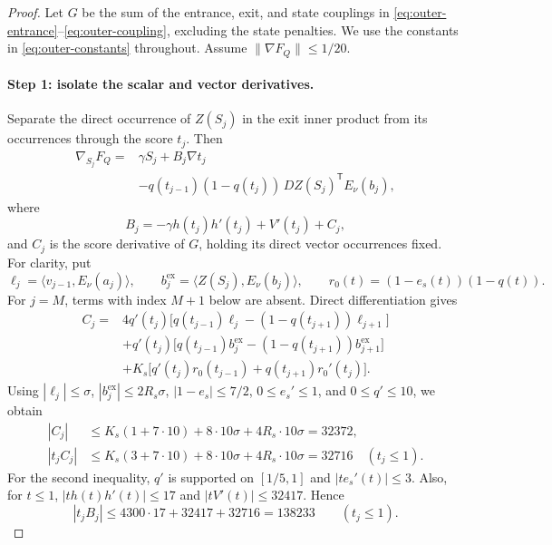 \documentclass[11pt,letterpaper]{article}
\theoremstyle{definition}
\theoremstyle{remark}
\begin{document}
\begin{proof}
Let $G$ be the sum of the entrance, exit, and state couplings in
\eqref{eq:outer-entrance}--\eqref{eq:outer-coupling}, excluding the state
penalties. We use the constants in \eqref{eq:outer-constants} throughout.
Assume $\|\nabla F_Q\|\le1/20$.

\paragraph{Step 1: isolate the scalar and vector derivatives.}
Separate the direct occurrence of $Z(S_j)$ in the exit inner product from
its occurrences through the score $t_j$. Then
\begin{equation}
\begin{split}
 \nabla_{S_j}F_Q
 ={}&\gamma S_j+B_j\nabla t_j\\
 &-q(t_{j-1})(1-q(t_j))\,DZ(S_j)^{\mathsf T}E_\nu(b_j),
\end{split}
\label{eq:state-gradient}
\end{equation}
where
\[
 B_j=-\gamma h(t_j)h'(t_j)+V'(t_j)+C_j,
\]
and $C_j$ is the score derivative of $G$, holding its direct vector
occurrences fixed. For clarity, put
\[
 \ell_j=\langle v_{j-1},E_\nu(a_j)\rangle,
 \qquad b_j^{\mathrm{ex}}=\langle Z(S_j),E_\nu(b_j)\rangle,
 \qquad r_0(t)=(1-e_s(t))(1-q(t)).
\]
For $j=M$, terms with index $M+1$ below are absent. Direct differentiation
gives
\begin{align*}
 C_j={}&4q'(t_j)\bigl[q(t_{j-1})\ell_j
                   -(1-q(t_{j+1}))\ell_{j+1}\bigr]\\
 &+q'(t_j)\bigl[q(t_{j-1})b_j^{\mathrm{ex}}
                   -(1-q(t_{j+1}))b_{j+1}^{\mathrm{ex}}\bigr]\\
 &+K_s\bigl[q'(t_j)r_0(t_{j-1})+q(t_{j+1})r_0'(t_j)\bigr].
\end{align*}
Using $|\ell_j|\le\sigma$, $|b_j^{\mathrm{ex}}|\le2R_s\sigma$,
$|1-e_s|\le7/2$, $0\le e_s'\le1$, and $0\le q'\le10$, we obtain
\begin{align}
 |C_j|&\le K_s(1+7\cdot10)+8\cdot10\sigma
                     +4R_s\cdot10\sigma=32372,\label{eq:C-bound}\\
 |t_jC_j|&\le K_s(3+7\cdot10)+8\cdot10\sigma
                     +4R_s\cdot10\sigma=32716
                     \quad(t_j\le1).\label{eq:tC-bound}
\end{align}
For the second inequality, $q'$ is supported on $[1/5,1]$ and
$|te_s'(t)|\le3$. Also, for $t\le1$,
$|th(t)h'(t)|\le17$ and $|tV'(t)|\le32417$. Hence
\begin{equation}
 |t_jB_j|\le4300\cdot17+32417+32716=138233
 \qquad(t_j\le1).
 \label{eq:tB-bound}
\end{equation}


\end{proof}
\end{document}

